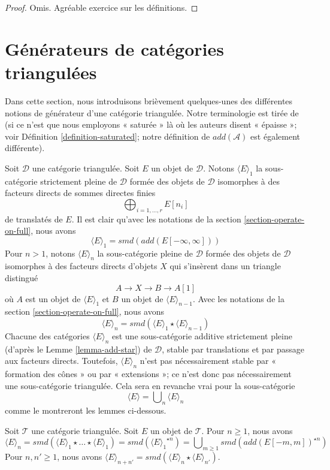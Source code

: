 \begin{proof}
Omis. Agréable exercice sur les définitions.
\end{proof}

\section{Générateurs de catégories triangulées}
\label{section-generators}

\noindent
Dans cette section, nous introduisons brièvement quelques-unes des différentes
notions de générateur d'une catégorie triangulée. Notre terminologie est tirée
de \cite{BvdB} (si ce n'est que nous employons « saturée » là où les auteurs
disent « épaisse »; voir Définition \ref{definition-saturated}; notre définition
de $add(\mathcal{A})$ est également différente).

\medskip\noindent
Soit $\mathcal{D}$ une catégorie triangulée. Soit $E$ un objet de
$\mathcal{D}$. Notons $\langle E \rangle_1$ la sous-catégorie strictement
pleine de $\mathcal{D}$ formée des objets de $\mathcal{D}$ isomorphes à des
facteurs directs de sommes directes finies
$$
\bigoplus\nolimits_{i = 1, \ldots, r} E[n_i]
$$
de translatés de $E$. Il est clair qu'avec les notations de la
section \ref{section-operate-on-full}, nous avons
$$
\langle E \rangle_1 = smd(add(E[-\infty, \infty]))
$$
Pour $n > 1$, notons $\langle E \rangle_n$ la sous-catégorie pleine de
$\mathcal{D}$ formée des objets de $\mathcal{D}$ isomorphes à des facteurs
directs d'objets $X$ qui s'insèrent dans un triangle distingué
$$
A \to X \to B \to A[1]
$$
où $A$ est un objet de $\langle E \rangle_1$ et $B$ un objet de
$\langle E \rangle_{n - 1}$. Avec les notations de la
section \ref{section-operate-on-full}, nous avons
$$
\langle E \rangle_n = smd(\langle E \rangle_1 \star \langle E \rangle_{n - 1})
$$
Chacune des catégories $\langle E \rangle_n$ est une sous-catégorie additive
strictement pleine (d'après le Lemme \ref{lemma-add-star}) de $\mathcal{D}$,
stable par translations et par passage aux facteurs directs. Toutefois,
$\langle E \rangle_n$ n'est pas nécessairement stable par « formation des
cônes » ou par « extensions »; ce n'est donc pas nécessairement une
sous-catégorie triangulée. Cela sera en revanche vrai pour la sous-catégorie
$$
\langle E \rangle = \bigcup\nolimits_n \langle E \rangle_n
$$
comme le montreront les lemmes ci-dessous.

\begin{lemma}
\label{lemma-generated-by-E-explicit}
Soit $\mathcal{T}$ une catégorie triangulée. Soit $E$ un objet de
$\mathcal{T}$. Pour $n \geq 1$, nous avons
$$
\langle E \rangle_n =
smd(\langle E \rangle_1 \star \ldots \star \langle E \rangle_1) =
smd({\langle E \rangle_1}^{\star n}) =
\bigcup\nolimits_{m \geq 1} smd(add(E[-m, m])^{\star n})
$$
Pour $n, n' \geq 1$, nous avons $\langle E \rangle_{n + n'} =
smd(\langle E \rangle_n \star \langle E \rangle_{n'})$.
\end{lemma}

